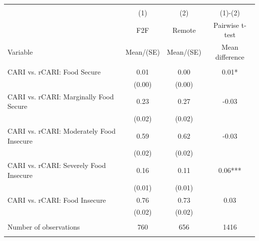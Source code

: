 
\begin{tabular}{@{\extracolsep{5pt}}lccc}
\\[-1.8ex]\hline \hline \\[-1.8ex]
 & \multicolumn{1}{c}{(1)}  & \multicolumn{1}{c}{(2)}  & \multicolumn{1}{c}{(1)-(2)} \\
 & \multicolumn{1}{c}{F2F}  & \multicolumn{1}{c}{Remote}  & \multicolumn{1}{c}{Pairwise t-test}  \\
Variable & Mean/(SE) & Mean/(SE) & Mean difference \\ \hline \\[-1.8ex] 
CARI vs. rCARI: Food Secure   & 0.01    & 0.00    & 0.01*   \\
 & (0.00)  & (0.00)  &  \\ [1ex]
CARI vs. rCARI: Marginally Food Secure   & 0.23    & 0.27    & -0.03   \\
 & (0.02)  & (0.02)  &  \\ [1ex]
CARI vs. rCARI: Moderately Food Insecure   & 0.59    & 0.62    & -0.03   \\
 & (0.02)  & (0.02)  &  \\ [1ex]
CARI vs. rCARI: Severely Food Insecure   & 0.16    & 0.11    & 0.06***   \\
 & (0.01)  & (0.01)  &  \\ [1ex]
CARI vs. rCARI: Food Insecure   & 0.76    & 0.73    & 0.03   \\
 & (0.02)  & (0.02)  &  \\ [1ex]
\hline \\[-1.8ex]
Number of observations  & 760   & 656  & 1416  \\
\hline \hline \\[-1.8ex]

\end{tabular}

